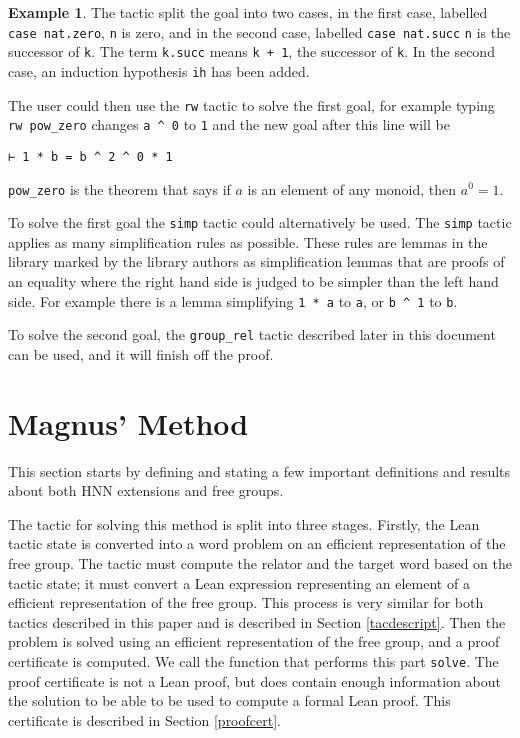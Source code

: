 \documentclass[12pt]{article} %
\theoremstyle{definition}
\theoremstyle{definition}
\theoremstyle{definition}
\theoremstyle{definition}
\newtheorem{exmpl}[thm]{Example}
\begin{document}
\begin{exmpl}
The tactic split the goal into two cases, in the first case, labelled \lstinline{case nat.zero},
\lstinline{n} is zero, and in the second case, labelled \lstinline{case nat.succ}
\lstinline{n} is the successor of \lstinline{k}. The term \lstinline{k.succ} means \lstinline{k + 1},
the successor of \lstinline{k}. In the second case, an induction
hypothesis \lstinline{ih} has been added.

The user could then use the \lstinline{rw} tactic to solve the first goal,
for example typing \lstinline{rw pow_zero} changes \lstinline{a ^ 0}
to \lstinline{1} and the new goal after this line will be
\begin{lstlisting}
⊢ 1 * b = b ^ 2 ^ 0 * 1
\end{lstlisting}

\lstinline{pow_zero} is the theorem that says if $a$ is an
element of any monoid, then $a^0= 1$.

To solve the first goal the \lstinline{simp} tactic could alternatively be used.
The \lstinline{simp} tactic applies as many simplification rules as possible.
These rules are lemmas in the library marked by the library authors as simplification
lemmas that are proofs of an equality where the right hand side is judged to be simpler
than the left hand side. For example there is a lemma simplifying \lstinline{1 * a} to
\lstinline{a}, or \lstinline{b ^ 1} to \lstinline{b}.

To solve the second goal, the \lstinline{group_rel} tactic described
later in this document can be used, and it will finish off the proof.

\end{exmpl}

\section{Magnus' Method}\label{magnusmethod}

This section starts by defining and stating a few important definitions and results about both
HNN extensions and free groups.

The tactic for solving this method is split into three stages. Firstly, the Lean tactic state
is converted into a word problem on an efficient representation of the free group. The tactic must
compute the relator and the target word based on the tactic state; it must convert a Lean
expression representing an element of a efficient representation of the free group. This process is very similar
for both tactics described in this paper and is described in Section \ref{tacdescript}. Then
the problem is solved using an efficient representation of the free group, and a proof certificate
is computed. We call the function that performs this part \lstinline{solve}.
 The proof certificate is not a Lean proof, but does contain enough information
about the solution to be able to be used to compute a formal Lean proof. This certificate is
described in Section \ref{proofcert}.
\end{document}
